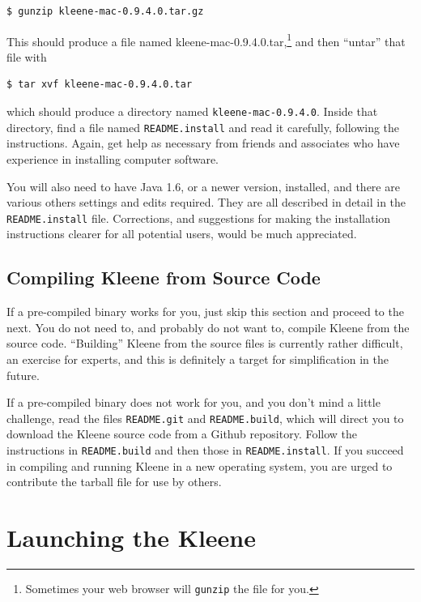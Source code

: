 \begin{Verbatim}
$ gunzip kleene-mac-0.9.4.0.tar.gz
\end{Verbatim}

\noindent
This should produce a file named kleene-mac-0.9.4.0.tar,\footnote{Sometimes 
your web browser will \texttt{gunzip} the file for you.} and then ``untar'' that file with

\begin{Verbatim}
$ tar xvf kleene-mac-0.9.4.0.tar
\end{Verbatim}

\noindent
which should produce a directory named \texttt{kleene-mac-0.9.4.0}.  Inside that directory, 
find a file named \texttt{README.install} and read it carefully, following the 
instructions.  Again, get help as necessary from friends and associates who have 
experience in installing computer
software.

You will also need to have Java 1.6, or a newer version, installed, and
there are various others settings and edits required.  They are all
described in detail in the \texttt{README.install} file.
Corrections, and suggestions for making the installation instructions clearer for all
potential users, would be much appreciated.

\subsection{Compiling Kleene from Source Code}

If a pre-compiled binary works for you, just skip this section and proceed to the next.
You do not need to, and probably do not want to, compile Kleene from the
source code.  ``Building'' Kleene from the source files is currently
rather difficult, an exercise for experts, and this is definitely a target
for simplification in the future.

If a pre-compiled binary does not work for you, and you don't mind a little
challenge, read the files \texttt{README.git} and \texttt{README.build},
which will direct you to download the Kleene source code from a Github
repository.  Follow the instructions in \texttt{README.build} and then
those in \texttt{README.install}.  If you succeed in compiling and running
Kleene in a new operating system, you are urged to contribute the
tarball file for use by others.

\section{Launching the Kleene }

